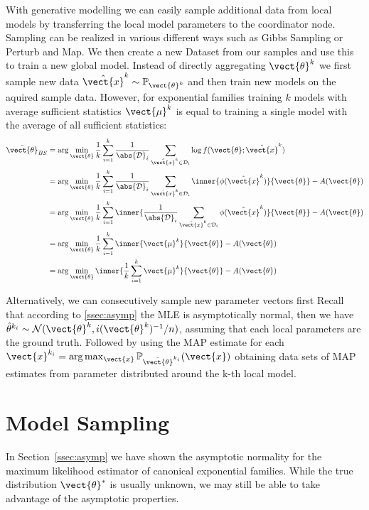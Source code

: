 With generative modelling we can easily sample additional data from local models by transferring the local model parameters to the coordinator node.
Sampling can be realized in various different ways such as Gibbs Sampling or Perturb and Map.
We then create a new Dataset from our samples and use this to train a new global model. 
Instead of directly aggregating $\vect{\theta}^k$ we first sample new data  $\hat{\vect{x}}^k \sim \mathbb{P}_{\vect{\theta}^k}$ and then train new models on the aquired sample data.
However, for exponential families training $k$ models with average sufficient statistics $\vect{\mu}^k$ is equal to training a single model with the average of all sufficient statistics:
\begin{equation}
    \begin{split}
        \bar{\vect{\theta}}_{BS} &= \arg\min_{\vect{\theta}} \frac{1}{k}\sum_{i=1}^k \frac{1}{\abs{\mathcal{D}}_i} \sum_{\hat{\vect{x}}^k \in \mathcal{D}_i} \log f(\vect{\theta}; \hat{\vect{x}}^k) \\
        &=  \arg\min_{\vect{\theta}} \frac{1}{k}\sum_{i=1}^k \frac{1}{\abs{\mathcal{D}}_i} \sum_{\hat{\vect{x}}^k \in \mathcal{D}_i} \inner{\phi(\hat{\vect{x}}^k)}{\vect{\theta}} - A(\vect{\theta}) \\
        &= \arg\min_{\vect{\theta}} \frac{1}{k}\sum_{i=1}^k \inner{\frac{1}{\abs{\mathcal{D}}_i} \sum_{\hat{\vect{x}}^k \in \mathcal{D}_i} \phi(\hat{\vect{x}}^k)}{\vect{\theta}} - A(\vect{\theta}) \\
        &= \arg\min_{\vect{\theta}} \frac{1}{k}\sum_{i=1}^k \inner{\vect{\mu}^k}{\vect{\theta}} - A(\vect{\theta}) \\
        & =  \arg\min_{\vect{\theta}} \inner{\frac{1}{k}\sum_{i=1}^k  \vect{\mu}^k}{\vect{\theta}} - A(\vect{\theta})
    \end{split}
\end{equation}

Alternatively, we can consecutively sample new parameter vectors first
Recall that according to \ref{ssec:asymp} the MLE is asymptotically normal, then we have $\hat{\theta}^{k_i}  \sim \mathcal{N}(\vect{\theta}^k, i(\vect{\theta}^k)^{-1}/n)$, assuming that each local parameters are the ground truth.
Followed by using the MAP estimate for each $\vect{x}^{k_i} = \arg\max_{\vect{x}} \mathbb{P}_{\hat{\vect{\theta}}^{k_i}}(\vect{x})$ obtaining data sets of MAP estimates from parameter distributed around the k-th local model.


\section{Model Sampling}
In Section~\ref{ssec:asymp} we have shown the asymptotic normality for the maximum likelihood estimator of canonical exponential families.
While the true distribution \wrt $\vect{\theta}^*$ is usually unknown, we may still be able to take advantage of the asymptotic properties. 

